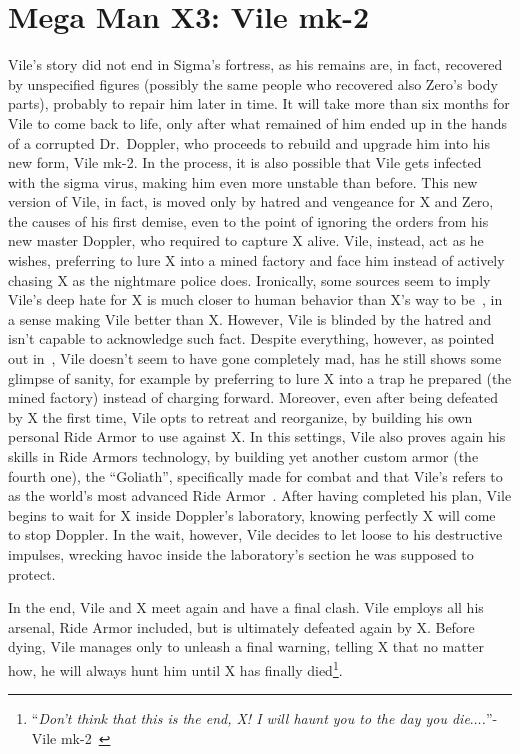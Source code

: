 \section{Mega Man X3: Vile mk-2}
Vile's story did not end in Sigma's fortress, as his remains are, in fact, recovered by unspecified figures (possibly the same people who recovered also Zero's body parts), probably to repair him later in time. It will take more than six months for Vile to come back to life, only after what remained of him ended up in the hands of a corrupted Dr.~Doppler, who proceeds to rebuild and upgrade him into his new form, Vile mk-2. In the process, it is also possible that Vile gets infected with the sigma virus, making him even more unstable than before. This new version of Vile, in fact, is moved only by hatred and vengeance for X and Zero, the causes of his first demise, even to the point of ignoring the orders from his new master Doppler, who required to capture X alive. Vile, instead, act as he wishes, preferring to lure X into a mined factory and face him instead of actively chasing X as the nightmare police does. Ironically, some sources seem to imply Vile's deep hate for X is much closer to human behavior than X's way to be~\cite{Xcoll1:Manual_X3,wayback:X3_resources}, in a sense making Vile better than X. However, Vile is blinded by the hatred and isn't capable to acknowledge such fact. Despite everything, however, as pointed out in~\cite{wayback:X3_resources}, Vile  doesn't seem to have gone completely mad, has he still shows some glimpse of sanity, for example by preferring to lure X into a trap he prepared (the mined factory) instead of charging forward. Moreover, even after being defeated by X the first time, Vile opts to retreat and reorganize, by building his own personal Ride Armor to use against X. In this settings, Vile also proves again his skills in Ride Armors technology, by building yet another custom armor (the fourth one), the ``Goliath'', specifically made for combat and that Vile's refers to as the world's most advanced Ride Armor~\cite{book:MH_field_guide}.  After having completed his plan, Vile begins to wait for X inside Doppler's laboratory, knowing perfectly X will come to stop Doppler. In the wait, however, Vile decides to let loose to his destructive impulses, wrecking havoc inside the laboratory's section he was supposed to protect. 

In the end, Vile and X meet again and have a final clash. Vile employs all his arsenal, Ride Armor included, but is ultimately defeated again by X. Before dying, Vile manages only to unleash a final warning, telling X that no matter how, he will always hunt him until X has finally died\footnote{``\textit{Don’t think that this is the end, X! I will haunt you to the day you die$\dots$.}''-Vile mk-2~\cite{wordpress:X3_japanese_script}}.
